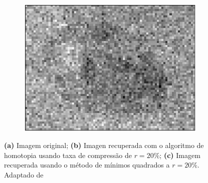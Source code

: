 {\begin{figure}
\begin{subfigure}[b]{0.3\textwidth}
        \centering
        \includegraphics[scale=.35]{imagens/homotopy/joaninhaMMQ_20porcento.png}
        \caption{}
	    \label{fig:homotopy_40porc}
    \end{subfigure}
    \caption{{\bf (a)} Imagem original; {\bf (b)} Imagen recuperada com o algoritmo de homotopia usando taxa de compressão de $r = 20\%$; {\bf (c)} Imagem recuperada usando o método de mínimos quadrados a  $r = 20\%$. Adaptado de \protect \footnotemark }
    \label{fig:homotopy}
\end{figure}
}
\clearpage